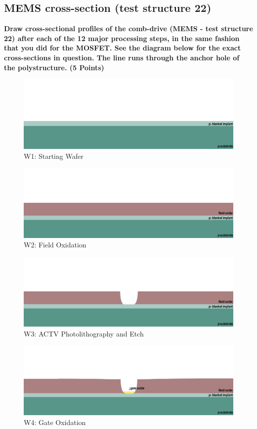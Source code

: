 \documentclass{article}
\begin{document}
\subsection{MEMS cross-section (test structure 22)}
\textbf{Draw cross-sectional profiles of the comb-drive (MEMS - test structure 22) after
each of the 12 major processing steps, in the same fashion that you did for the
MOSFET. See the diagram below for the exact cross-sections in question. The line
runs through the anchor hole of the polystructure. (5 Points)}
\begin{figure}[H]
\centering
\includegraphics[width=350pt]{CrossSections/MEMSlabprofiles/MEMSw1.png}
\caption{W1: Starting Wafer}
\end{figure}
\begin{figure}[H]
\centering
\includegraphics[width=350pt]{CrossSections/MEMSlabprofiles/MEMSw2.png}
\caption{W2: Field Oxidation}
\end{figure}
\begin{figure}[H]
\centering
\includegraphics[width=350pt]{CrossSections/MEMSlabprofiles/MEMSw3.png}
\caption{W3: ACTV Photolithography and Etch}
\end{figure}
\begin{figure}[H]
\centering
\includegraphics[width=350pt]{CrossSections/MEMSlabprofiles/MEMSw4.png}
\caption{W4: Gate Oxidation}
\end{figure}
\end{document}
